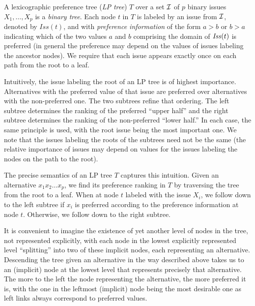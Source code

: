 A lexicographic preference tree (\emph{LP tree}) $T$ over a set $\mathcal{I}$ 
of $p$ binary issues $X_1,\ldots,X_p$ is a \emph{binary tree}. Each
node $t$ in $T$ is labeled by an issue from $\mathcal{I}$, denoted by 
$\mathit{Iss}(t)$, and with \emph{preference information} of the form
$a>b$ or $b>a$ indicating which of the two values $a$ and $b$  comprising
the domain of $\mathit{Iss}(t)$ is preferred (in general the preference may depend
on the values of issues labeling the ancestor nodes). We require that 
each issue appears exactly once on each path from the root to a leaf. 

Intuitively, the issue labeling the root of an LP tree is of highest 
importance. Alternatives with the preferred value of that issue
are preferred over alternatives with the non-preferred one. The two
subtrees refine that ordering. The left subtree determines the ranking
of the preferred ``upper half'' and the right subtree determines the 
ranking of the non-preferred ``lower half.'' In each case, the same 
principle is used, with the root issue being the most important one. 
We note that the issues labeling the roots of the 
subtrees need not be the same (the relative importance of issues may 
depend on values for the issues labeling the nodes on the path to the root).

The precise semantics of an LP tree $T$ captures this intuition. Given 
an alternative $x_1x_2\ldots x_p$, we find its preference ranking in 
$T$ by traversing the tree from the root to a leaf. When at node $t$ 
labeled with the issue $X_i$, we follow down to the left subtree if
$x_i$ is preferred according to the preference information at node
$t$. Otherwise, we follow down to the right subtree. 

It is convenient to imagine the existence of yet another level of nodes 
in the tree, not represented explicitly, with each node in the lowest 
explicitly represented level ``splitting'' into two of these
implicit nodes, each representing an alternative. Descending the tree 
given an alternative in the way described above takes us to an (implicit) 
node at the lowest level that represents precisely that alternative.
The more to the left the node representing the alternative, the more 
preferred it is, with the one in the leftmost (implicit) node being the 
most desirable one as left links always correspond to preferred values.


